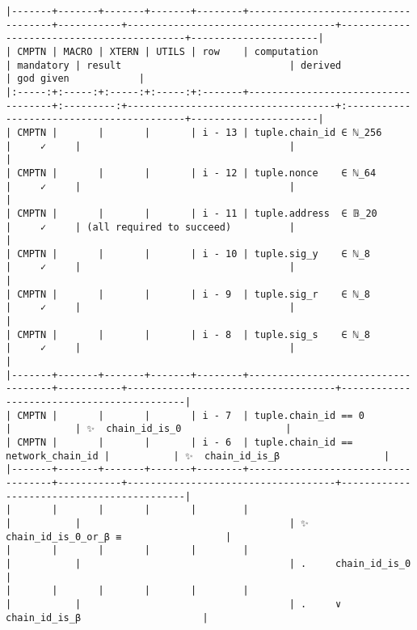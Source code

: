 \documentclass[varwidth=\maxdimen,margin=0.5cm,multi={verbatim}]{standalone}
\begin{document}
\begin{verbatim}
|-------+-------+-------+-------+--------+------------------------------------+-----------+------------------------------------+-------------------------------------------+----------------------|
| CMPTN | MACRO | XTERN | UTILS | row    | computation                        | mandatory | result                             | derived                                   | god given            |
|:-----:+:-----:+:-----:+:-----:+:-------+------------------------------------+:---------:+------------------------------------+:------------------------------------------+----------------------|
| CMPTN |       |       |       | i - 13 | tuple.chain_id ∈ ℕ_256             |     ✓     |                                    |                                           |
| CMPTN |       |       |       | i - 12 | tuple.nonce    ∈ ℕ_64              |     ✓     |                                    |                                           |
| CMPTN |       |       |       | i - 11 | tuple.address  ∈ 𝔹_20              |     ✓     | (all required to succeed)          |                                           |
| CMPTN |       |       |       | i - 10 | tuple.sig_y    ∈ ℕ_8               |     ✓     |                                    |                                           |
| CMPTN |       |       |       | i - 9  | tuple.sig_r    ∈ ℕ_8               |     ✓     |                                    |                                           |
| CMPTN |       |       |       | i - 8  | tuple.sig_s    ∈ ℕ_8               |     ✓     |                                    |                                           |
|-------+-------+-------+-------+--------+------------------------------------+-----------+------------------------------------+-------------------------------------------|
| CMPTN |       |       |       | i - 7  | tuple.chain_id == 0                |           | ✨  chain_id_is_0                  |
| CMPTN |       |       |       | i - 6  | tuple.chain_id == network_chain_id |           | ✨  chain_id_is_β                  |
|-------+-------+-------+-------+--------+------------------------------------+-----------+------------------------------------+-------------------------------------------|
|       |       |       |       |        |                                    |           |                                    | ✨  chain_id_is_0_or_β ≡                  |
|       |       |       |       |        |                                    |           |                                    | .     chain_id_is_0                       |
|       |       |       |       |        |                                    |           |                                    | .     ∨ chain_id_is_β                     |

\end{verbatim}
\end{document}
